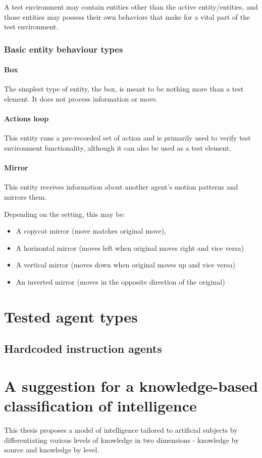\documentclass[masterthesis]{fer}
\begin{document}
A test environment may contain entities other than the active entity/entities,
and those entities may possess their own behaviors that make for a vital part of the test environment.
\subsubsection{Basic entity behaviour types}
\paragraph{Box}
The simplest type of entity, the box, is meant to be nothing more than a test element. It does not process information or move.
\paragraph{Actions loop}
This entity runs a pre-recorded set of action and is primarily used to verify test environment functionality, although it can also be used as a test element.
\paragraph{Mirror}
This entity receives information about another agent's motion patterns and mirrors them.

Depending on the setting, this may be:
\begin{itemize}
\item A copycat mirror (move matches original move),
\item A horizontal mirror (moves left when original moves right and vice versa)
\item A vertical mirror (moves down when original moves up and vice versa)
\item An inverted mirror (moves in the opposite direction of the original)
\end{itemize}
 
\section{Tested agent types}
\subsection{Hardcoded instruction agents}
\section{A suggestion for a knowledge-based classification of intelligence}
This thesis proposes a model of intelligence tailored to artificial subjects
by differentiating various levels of knowledge in two dimensions - knowledge by source and knowledge by level.
\end{document}
